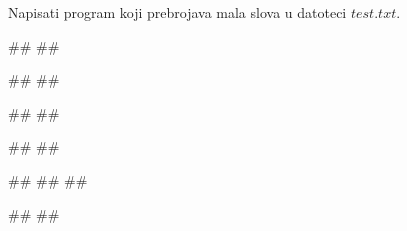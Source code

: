 \begin{Exercise}[label=p3_01] 
Napisati program koji prebrojava mala slova u datoteci $test.txt$. \\
\begin{minitest}
\begin{upotreba}{1}
##
##

#\naslovIzlaz#
##
\end{upotreba}
\end{minitest}
\begin{minitest}
\begin{upotreba}{2}
##
##

#\naslovIzlaz#
##
\end{upotreba}
\end{minitest}
\begin{minitest}
\begin{upotreba}{3}
##
##
##

#\naslovIzlaz#
##
\end{upotreba}
\end{minitest}
\end{Exercise}
\begin{Answer}[ref=p3_01]
\end{Answer}


